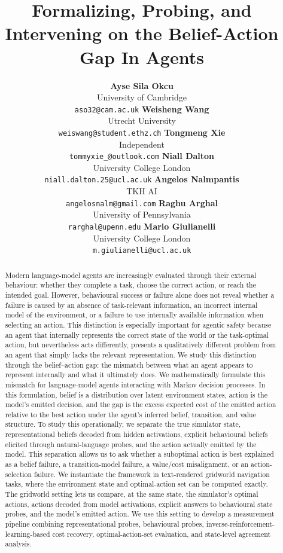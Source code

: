 \documentclass[final]{sparreport}
\title{Formalizing, Probing, and Intervening on the Belief-Action Gap In Agents}
\author{
    \textbf{Ayse Sila Okcu}\\
    University of Cambridge\\
  \texttt{aso32@cam.ac.uk}
  \And
  \textbf{Weisheng Wang}\\
  Utrecht University\\
  \texttt{weiswang@student.ethz.ch}
  \And
  \textbf{Tongmeng Xie}\\
  Independent\\
  \texttt{tommyxie\_@outlook.com}
  \AND
  \textbf{Niall Dalton}\\
  University College London\\
  \texttt{niall.dalton.25@ucl.ac.uk}
  \And
  \textbf{Angelos Nalmpantis}\\
  TKH AI\\
  \texttt{angelosnalm@gmail.com}
  \AND
  \textbf{Raghu Arghal}\\
  University of Pennsylvania\\
  \texttt{rarghal@upenn.edu}
  \And
  \textbf{Mario Giulianelli}\\
  University College London\\
  \texttt{m.giulianelli@ucl.ac.uk}
}
\begin{document}
\maketitle

\begin{abstract}
Modern language-model agents are increasingly evaluated through their external behaviour: whether they complete a task, choose the correct action, or reach the intended goal. However, behavioural success or failure alone does not reveal whether a failure is caused by an absence of task-relevant information, an incorrect internal model of the environment, or a failure to use internally available information when selecting an action. This distinction is especially important for agentic safety because an agent that internally represents the correct state of the world or the task-optimal action, but nevertheless acts differently, presents a qualitatively different problem from an agent that simply lacks the relevant representation. We study this distinction through the belief--action gap: the mismatch between what an agent appears to represent internally and what it ultimately does. We mathematically formulate this mismatch for language-model agents interacting with Markov decision processes. In this formulation, belief is a distribution over latent environment states, action is the model's emitted decision, and the gap is the excess expected cost of the emitted action relative to the best action under the agent's inferred belief, transition, and value structure. To study this operationally, we separate the true simulator state, representational beliefs decoded from hidden activations, explicit behavioural beliefs elicited through natural-language probes, and the action actually emitted by the model. This separation allows us to ask whether a suboptimal action is best explained as a belief failure, a transition-model failure, a value/cost misalignment, or an action-selection failure. We instantiate the framework in text-rendered gridworld navigation tasks, where the environment state and optimal-action set can be computed exactly. The gridworld setting lets us compare, at the same state, the simulator's optimal actions, actions decoded from model activations, explicit answers to behavioural state probes, and the model's emitted action. We use this setting to develop a measurement pipeline combining representational probes, behavioural probes, inverse-reinforcement-learning-based cost recovery, optimal-action-set evaluation, and state-level agreement analysis.
\end{abstract}
\end{document}
